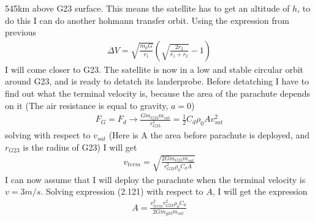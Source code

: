\documentclass[a4paper,11pt,english]{report}
\begin{document}
545km\) above G23 surface. This means the satellite has to get an altitude of
\(h\), to do this I can do another hohmann transfer orbit. Using the expression
from previous
\begin{align}
  \Delta V = \sqrt{\frac{m_{p}G}{r_{1}}}(\sqrt{\frac{2r_{2}}{r_{1} + r_{2}}} - 1)
\end{align}
I will come closer to G23. The satellite is now in a low and stable circular
orbit around G23, and is ready to detatch its landerprobe. Before detatching I
have to find out what the terminal velocity is, because the area of the
parachute depends on it (The air resistance is equal to gravity, \(a = 0\))
\begin{align}
  F_{G} = F_{d}  \to \frac{Gm_{G23}m_{sat}}{r^{2}_{G23}} = \frac{1}{2}
  C_{d}\rho_{0}Av^{2}_{sat}
\end{align}
solving with respect to \(v_{sat}\) (Here is A the area before parachute is
deployed, and \(r_{G23}\) is the radius of G23) I will get
\begin{align}
  v_{term} = \sqrt{\frac{2Gm_{G23}m_{sat}}{r_{G23}^{2}\rho_{0}C_{d}A}}
\end{align}
I can now assume that I will deploy the parachute when the terminal velocity is
\(v = 3m/s\). Solving expression (2.121) with respect to \(A\), I will get the
expression
\begin{align}
  A = \frac{v_{term}^{2}r_{G23}^{2}\rho_{0}C_{d}}{2Gm_{g23}m_{sat}}
\end{align}
\newpage
\end{document}
